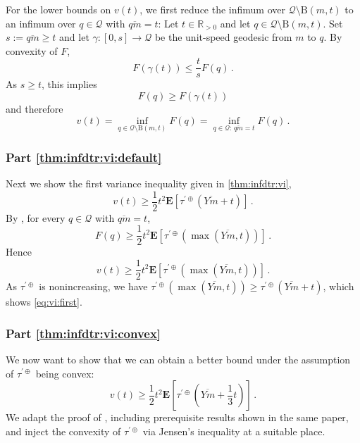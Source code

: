 \documentclass{article}
\newcommand*{\mc}[1]{\mathcal{#1}}
\newcommand{\R}{\mathbb{R}}
\newcommand{\Rpp}{\R_{>0}}
\newcommand{\ball}{\mathrm{B}}
\newcommand{\lab}{\left[} %
\newcommand{\rab}{\right]} %
\newcommand{\ab}[1]{\lab #1 \rab} %
\newcommand{\abOf}[1]{\!\ab{#1}} %
\newcommand{\lb}{\left(} %
\newcommand{\rb}{\right)} %
\newcommand{\br}[1]{\lb #1 \rb} %
\newcommand{\brOf}[1]{\!\br{#1}} %
\newcommand{\E}{\mathbf{E}} %
\newcommand{\EOf}[1]{\E\abOf{#1}}
\newcommand{\eqfs}{\,.}
\newcommand{\ol}[2]{\overline{#1#2}}
\newcommand{\ddrtran}{\tau^{\prime\oplus}}
\newcommand{\ballopen}{\ball}
\begin{document}
For the lower bounds on $v(t)$, we first reduce the infimum over $\mc Q\setminus\ballopen(m,t)$ to an infimum over $q\in\mc Q$ with $\ol qm = t$:
Let $t\in\Rpp$ and let $q\in\mc Q\setminus\ballopen(m,t)$.
Set $s:=\ol qm\ge t$ and let
$\gamma:[0,s]\to\mc Q$
be the unit-speed geodesic from $m$ to $q$.
By convexity of $F$,
\begin{equation}
    F(\gamma(t))
    \le
    \frac{t}{s}F(q)
    \eqfs
\end{equation}
As $s\ge t$, this implies
\begin{equation}
    F(q)\ge F(\gamma(t))
\end{equation}
and therefore
\begin{equation}
    v(t)
    =
    \inf_{q\in\mc Q\setminus\ballopen(m,t)}F(q)
    =
    \inf_{q\in\mc Q:\,\ol qm=t}F(q)
    \eqfs
\end{equation}

\subsubsection{Part \ref{thm:infdtr:vi:default}}

Next we show the first variance inequality given in \cref{thm:infdtr:vi},
\begin{equation}\label{eq:vi:first}
    v(t) \geq \frac12 t^2 \EOf{\ddrtran\brOf{\ol Ym + t}}
    \eqfs
\end{equation}
By \cite[Theorem 5.4]{varinequ}, for every $q\in\mc Q$ with $\ol qm=t$,
\begin{equation}
    F(q)
    \ge
    \frac12 t^2
    \EOf{\ddrtran\brOf{\max(\ol Ym,t)}}
    \eqfs
\end{equation}
Hence
\begin{equation}
    v(t)
    \ge
    \frac12 t^2
    \EOf{\ddrtran\brOf{\max(\ol Ym,t)}}
    \eqfs
\end{equation}
As $\ddrtran$ is nonincreasing, we have $\ddrtran(\max(\ol Ym, t)) \geq \ddrtran(\ol Ym + t)$, which shows \eqref{eq:vi:first}.

\subsubsection{Part \ref{thm:infdtr:vi:convex}}

We now want to show that we can obtain a better bound under the assumption of $\ddrtran$ being convex:
\begin{equation}
    v(t) \geq \frac12 t^2 \EOf{\ddrtran\brOf{\ol Ym + \frac13 t}}
    \eqfs
\end{equation}
We adapt the proof of \cite[Theorem 5.4]{varinequ}, including prerequisite results shown in the same paper, and inject the convexity of $\ddrtran$ via Jensen's inequality at a suitable place.
\end{document}
